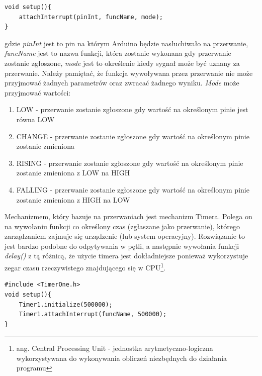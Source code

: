 \documentclass{xmgr}
\begin{document}
\begin{lstlisting}[label=bot-dirs-alg,caption=Obsługa przerwań sprzętowych w środowisku Arduino]
void setup(){
	attachInterrupt(pinInt, funcName, mode);
}
\end{lstlisting}
gdzie \emph{pinInt} jest to pin na którym Arduino będzie nasłuchiwało na przerwanie, \emph{funcName} jest to nazwa funkcji, która zostanie wykonana gdy przerwanie zostanie zgłoszone, \emph{mode} jest to określenie kiedy sygnał może być uznany za przerwanie. Należy pamiętać, że funkcja wywoływana przez przerwanie nie może przyjmować żadnych parametrów oraz zwracać żadnego wyniku. \emph{Mode} może przyjmować wartości:
 
\begin{enumerate}
	\item LOW - przerwanie zostanie zgłoszone gdy wartość na określonym pinie jest równa LOW
	\item CHANGE - przerwanie zostanie zgłoszone gdy wartość na określonym pinie zostanie zmieniona
	\item RISING - przerwanie zostanie zgłoszone gdy wartość na określonym pinie zostanie zmieniona z LOW na HIGH
	\item FALLING - przerwanie zostanie zgłoszone gdy wartość na określonym pinie zostanie zmieniona z HIGH na LOW
\end{enumerate}

Mechanizmem, który bazuje na przerwaniach jest mechanizm Timera. Polega on na wywołaniu funkcji co określony czas (zgłaszane jako przerwanie), którego zarządzaniem zajmuje się urządzenie (lub system operacyjny). Rozwiązanie to jest bardzo podobne do odpytywania w pętli, a następnie wywołania funkcji \emph{delay()} z tą różnicą, że użycie timera jest dokładniejsze ponieważ wykorzystuje zegar czasu rzeczywistego znajdującego się w CPU\footnote{ang. Central Processing Unit - jednostka arytmetyczno-logiczna wykorzystywana do wykonywania obliczeń niezbędnych do działania programu}.
\begin{lstlisting}[label=bot-dirs-alg,caption=Przykładowe użycie timer w środowisku Arduino]
#include <TimerOne.h>
void setup(){
	Timer1.initialize(500000);
	Timer1.attachInterrupt(funcName, 500000);
}
\end{lstlisting}
\end{document}
